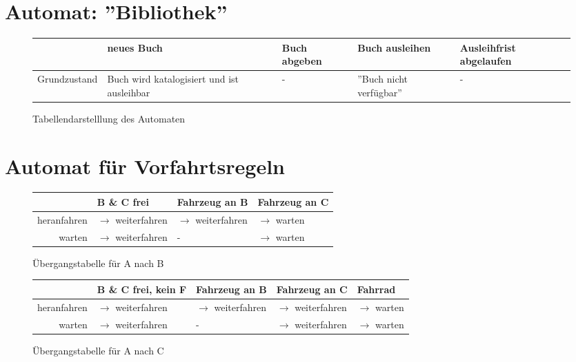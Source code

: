 \documentclass[11pt,a4paper]{article}
\begin{document}
	\section{Automat: ''Bibliothek''}
		\begin{figure}[h]
			\centering
			
			\begin{tabular}{c | p{2.5cm} p{2.5cm} p{2.5cm} p{4cm}}
				&	neues Buch	&	Buch abgeben	&	Buch ausleihen 	&	Ausleihfrist abgelaufen	\\ \hline
									
				Grundzustand	&	\tiny Buch wird katalogisiert und ist ausleihbar	& - &	\tiny ''Buch nicht verfügbar''	& -	\\
				
				
			\end{tabular}
			
			\caption{Tabellendarstelllung des Automaten}
			\label{tab:t1}
		\end{figure}
	\section{Automat für Vorfahrtsregeln}
	
		\begin{figure}[h]
			\centering
			
			\begin{tabular}{r | l l l}
				& B \& C frei & Fahrzeug an B & Fahrzeug an C \\ \hline
				heranfahren & $\rightarrow$ weiterfahren & $\rightarrow$ weiterfahren & $\rightarrow$ warten \\
				warten & $\rightarrow$ weiterfahren & - & $\rightarrow$ warten \\
			\end{tabular}			
			\caption{Übergangstabelle für A nach B}
			\label{tab:t2}
		\end{figure}
		
		\begin{figure}[h]
			\begin{tabular}{r | l l l l}
				& B \& C frei, kein F & Fahrzeug an B & Fahrzeug an C & Fahrrad \\ \hline
				heranfahren & $\rightarrow$ weiterfahren & $\rightarrow$ weiterfahren & $\rightarrow$ weiterfahren & $\rightarrow$ warten \\
				warten & $\rightarrow$ weiterfahren & - & $\rightarrow$ weiterfahren & $\rightarrow$ warten \\
			\end{tabular}			
			\caption{Übergangstabelle für A nach C}
			\label{tab:t3}
		\end{figure}
		
\end{document}

